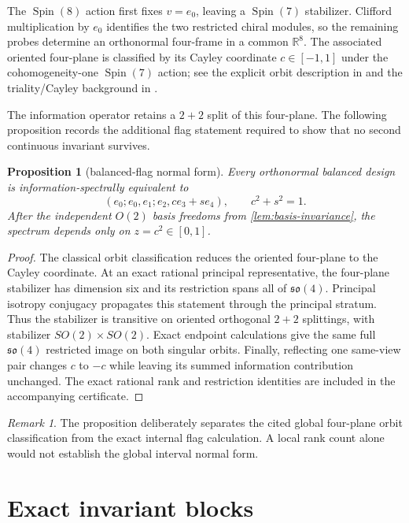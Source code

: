 \documentclass[11pt]{amsart}
\newtheorem{proposition}[theorem]{Proposition}
\theoremstyle{remark}
\newtheorem{remark}[theorem]{Remark}
\DeclareMathOperator{\Spin}{Spin}
\begin{document}
The $\Spin(8)$ action first fixes $v=e_0$, leaving a $\Spin(7)$ stabilizer.
Clifford multiplication by $e_0$ identifies the two restricted chiral modules,
so the remaining probes determine an orthonormal four-frame in a common
$\mathbb R^8$.  The associated oriented four-plane is classified by its Cayley
coordinate $c\in[-1,1]$ under the cohomogeneity-one $\Spin(7)$ action; see the
explicit orbit description in \cite[Section~4]{BerndtTamaru2007} and the
triality/Cayley background in \cite{KatzShnider2010}.

The information operator retains a $2+2$ split of this four-plane.  The
following proposition records the additional flag statement required to show
that no second continuous invariant survives.

\begin{proposition}[balanced-flag normal form]\label{prop:normal-form}
Every orthonormal balanced design is information-spectrally equivalent to
\[
 (e_0;e_0,e_1;e_2,ce_3+se_4),
 \qquad c^2+s^2=1.
\]
After the independent $O(2)$ basis freedoms from
\cref{lem:basis-invariance}, the spectrum depends only on $z=c^2\in[0,1]$.
\end{proposition}

\begin{proof}
The classical orbit classification reduces the oriented four-plane to the
Cayley coordinate.  At an exact rational principal representative, the
four-plane stabilizer has dimension six and its restriction spans all of
$\mathfrak{so}(4)$.  Principal isotropy conjugacy propagates this statement
through the principal stratum.  Thus the stabilizer is transitive on oriented
orthogonal $2+2$ splittings, with stabilizer
$SO(2)\times SO(2)$.  Exact endpoint calculations give the same full
$\mathfrak{so}(4)$ restricted image on both singular orbits.  Finally,
reflecting one same-view pair changes $c$ to $-c$ while leaving its summed
information contribution unchanged.  The exact rational rank and restriction
identities are included in the accompanying certificate.
\end{proof}

\begin{remark}
The proposition deliberately separates the cited global four-plane orbit
classification from the exact internal flag calculation.  A local rank count
alone would not establish the global interval normal form.
\end{remark}

\section{Exact invariant blocks}
\end{document}
